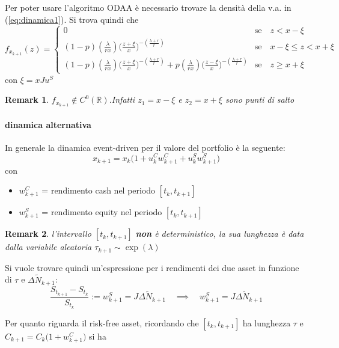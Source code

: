 \documentclass[12pt]{article}
\theoremstyle{break}
\newtheorem{remark}{Remark}
\begin{document}
Per poter usare l'algoritmo ODAA è necessario trovare la densità della v.a. in (\ref{eq:dinamica1}). Si trova quindi che 
\begin{equation}
f_{x_{k+1}}(z) = 
\begin{cases}
0 & \text{se} \quad z < x - \xi\\
(1-p)(\frac{\lambda}{r x})\Big(\frac{z+\xi}{x}\Big)^{-(\frac{\lambda+r}{r})} & \text{se} \quad x-\xi \leq z < x + \xi \\
(1-p)(\frac{\lambda}{r x})\Big(\frac{z+\xi}{x}\Big)^{-(\frac{\lambda+r}{r})} + p(\frac{\lambda}{r x})\Big(\frac{z-\xi}{x}\Big)^{-(\frac{\lambda+r}{r})} & \text{se} \quad z \geq x + \xi
\end{cases}
\end{equation}
con $ \xi = xJu^S$

\begin{remark}
	$f_{x_{k+1}} \notin C^0(\mathbb{R})$.Infatti  $z_1 = x - \xi$ e $z_2 = x + \xi$ sono punti di salto
\end{remark}

\paragraph{dinamica alternativa}
In generale la dinamica event-driven per il valore del portfolio è la seguente:
\begin{equation}
	x_{k+1} = x_k\Big( 1 + u^C_k w^C_{k+1} + u^S_k w^S_{k+1}\Big)
\end{equation}
con 
\begin{itemize}
	\item $w^C_{k+1}$ = rendimento cash nel periodo $[t_k,t_{k+1}]$
	\item $w^S_{k+1}$ = rendimento equity nel periodo $[t_k,t_{k+1}]$
\end{itemize}

\vspace*{0.5cm}
\begin{remark}
	l'intervallo $[t_k,t_{k+1}]$ \textbf{non} è deterministico, la sua lunghezza è data dalla variabile aleatoria $\tau_{k+1} \sim \exp(\lambda)$
\end{remark}
\vspace*{0.5cm}
Si vuole trovare quindi un'espressione per i rendimenti dei due asset in funzione di $\tau$ e $\Delta \widetilde{N}_{k+1}$:
\[
\frac{S_{t_{k+1}} - S_{t_{k}}}{S_{t_{k}}} := w^S_{k+1} = J\Delta \widetilde{N}_{k+1} \quad \implies \quad \boxed{w^S_{k+1} = J\Delta \widetilde{N}_{k+1}} 
\]

Per quanto riguarda il risk-free asset, ricordando che $[t_k,t_{k+1}]$ ha lunghezza $\tau$ e $C_{k+1} = C_k\big(1 + w^C_{k+1} \big)$ si ha
\end{document}
